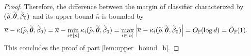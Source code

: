 \begin{proof}
Therefore, the difference between the margin of classifier characterized by $(\widetilde\rho, \widetilde{{\boldsymbol{\theta}}}, \widetilde\beta_0)$ and its upper bound $\bar\kappa$ is bounded by
\begin{equation*}
    \overline\kappa - \kappa(\widetilde\rho, \widetilde{{\boldsymbol{\theta}}}, \widetilde\beta_0) 
    = 
     \overline\kappa - \min_{i \in [n]} \kappa_i(\widetilde\rho, \widetilde{{\boldsymbol{\theta}}}, \widetilde\beta_0) 
    = \max_{i \in [n]} \left|{\overline\kappa - \kappa_i(\widetilde\rho, \widetilde{{\boldsymbol{\theta}}}, \widetilde\beta_0)}\right| = O_{\mathbb{P}}(\log d) = \widetilde O_{\mathbb{P}}(1).
\end{equation*}
This concludes the proof of part \ref{lem:upper_bound_b}.



\end{proof}
